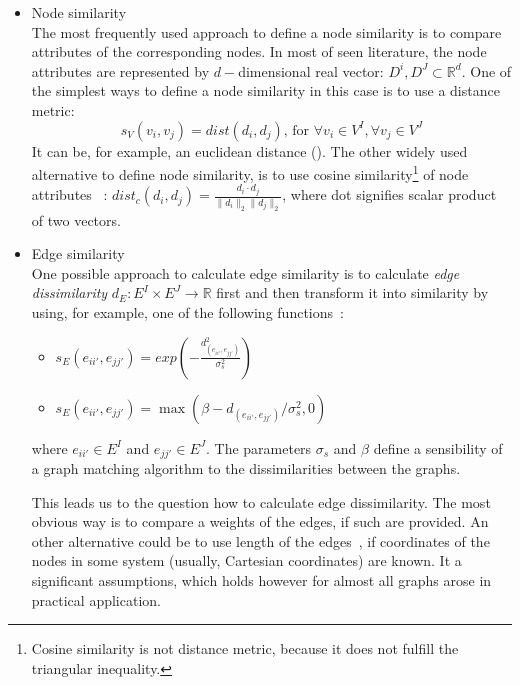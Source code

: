 \begin{itemize}
\item Node similarity\\
	The most frequently used approach to define a node similarity is to compare attributes of the corresponding nodes. In most of seen literature, the node attributes are represented by $d-$dimensional real vector: $D^i,D^J\subset\mathbb{R}^d$. One of the simplest ways to define a node similarity in this case is to use a distance metric:
	\begin{equation}
	s_V(v_i,v_j) = dist(d_i,d_j)\text{, for }\forall v_i\in V^I,\forall v_j\in V^J
	\end{equation}
	It can be, for example, an euclidean distance %
	(\cite{Cho2010_RRWM}).
	The other widely used alternative to define node similarity, is to use cosine similarity\footnote{Cosine similarity is not distance metric, because it does not fulfill the triangular inequality.} of node attributes ~\cite{CliqueGraph_CVPR2015}: $dist_c(d_i,d_j)=\frac{d_i\cdot d_j}{\|d_i\|_2\|d_j\|_2}$, where dot signifies scalar product of two vectors.
\vspace{-5pt}
\item Edge similarity\\
	One possible approach to calculate edge similarity is to calculate \emph{edge dissimilarity} $d_E:E^I\times E^J\rightarrow\mathbb{R}$ first and then transform it into similarity by using, for example, one of the following functions~\cite{Cho2014_Haystack, Cho2009_AgglClustering, Cho2010_RRWM,Cho2012_ProgressiveGM}:
	\begin{itemize}
	\item $s_E(e_{ii\prime}, e_{jj\prime})= exp(-\frac{d_(e_{ii\prime}, e_{jj\prime})^2}{\sigma^2_{s}})$
	\item $s_E(e_{ii\prime}, e_{jj\prime})= \max(\beta - d_(e_{ii\prime}, e_{jj\prime})/\sigma^2_{s},0)$
	\end{itemize}
	where $e_{ii\prime}\in E^I$ and $e_{jj\prime}\in E^J$. The parameters $\sigma_s$ and $\beta$ define a sensibility of a graph matching algorithm to the dissimilarities between the graphs.
	
	This leads us to the question how to calculate edge dissimilarity. The most obvious way is to compare a weights of the edges, if such are provided. An other alternative could be to use length of the edges~\cite{Cho2014_Haystack, Cho2009_AgglClustering, Cho2010_RRWM,Cho2012_ProgressiveGM}, if coordinates of the nodes in some system (usually, Cartesian coordinates) are known. It a significant assumptions, which holds however for almost all graphs arose in practical application.
	

\end{itemize}
